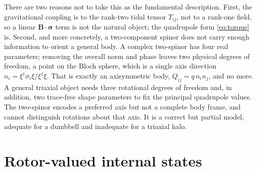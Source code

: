 \documentclass[11pt,a4paper]{article}
\begin{document}
There are two reasons not to take this as the fundamental description. First, the
gravitational coupling is to the rank-two tidal tensor $T_{ij}$, not to a rank-one
field, so a linear $\mathbf{B}\cdot\bm{\sigma}$ term is not the natural object; the
quadrupole form \eqref{eq:torque} is. Second, and more concretely, a two-component
spinor does not carry enough information to orient a general body. A complex two-spinor
has four real parameters; removing the overall norm and phase leaves two physical
degrees of freedom, a point on the Bloch sphere, which is a single axis direction
$n_i = \xi^{\dagger}\sigma_i\xi / \xi^{\dagger}\xi$. That is exactly an axisymmetric
body, $Q_{ij}=q\,n_i n_j$, and no more. A general triaxial object needs three
rotational degrees of freedom and, in addition, two trace-free shape parameters to fix
the principal quadrupole values. The two-spinor encodes a preferred axis but not a
complete body frame, and cannot distinguish rotations about that axis. It is a correct
but partial model, adequate for a dumbbell and inadequate for a triaxial halo.

\section{Rotor-valued internal states}
\label{sec:rotor}
\end{document}
